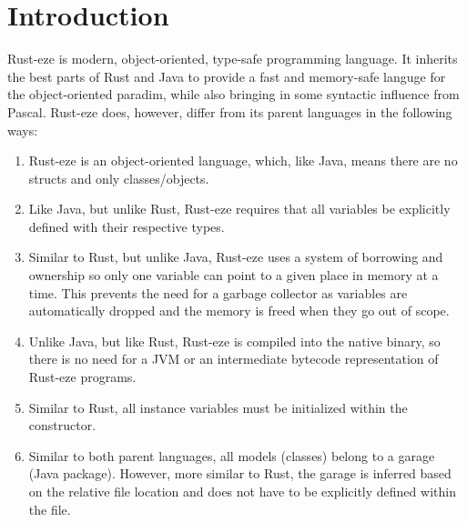 \documentclass[letterpaper, 10pt, DIV=13]{scrartcl}
\numberwithin{equation}{section}
\numberwithin{figure}{section}
\numberwithin{table}{section}
\begin{document}
\section{Introduction}
Rust-eze is modern, object-oriented, type-safe programming language. It inherits
the best parts of Rust and Java to provide a fast and memory-safe languge for
the object-oriented paradim, while also bringing in some syntactic influence from Pascal.
Rust-eze does, however, differ from its parent languages in the following ways:
\begin{enumerate}
    \item Rust-eze is an object-oriented language, which, like Java, means there
          are no structs and only classes/objects.
    \item Like Java, but unlike Rust, Rust-eze requires that all
          variables be explicitly defined with their respective types.
    \item Similar to Rust, but unlike Java, Rust-eze uses a system of borrowing
          and ownership so only one variable can point to a given place in
          memory at a time. This prevents the need for a garbage collector as
          variables are automatically dropped and the memory is freed when they
          go out of scope.
    \item Unlike Java, but like Rust, Rust-eze is compiled into the native
          binary, so there is no need for a JVM or an intermediate bytecode
          representation of Rust-eze programs.
    \item Similar to Rust, all instance variables must be initialized within the
          constructor.
    \item Similar to both parent languages, all models (classes) belong to a garage
          (Java package). However, more similar to Rust, the garage is inferred
          based on the relative file location and does not have to be explicitly
          defined within the file.
\end{enumerate}

\newpage
\end{document}
